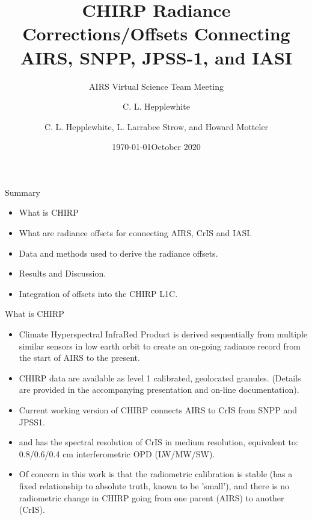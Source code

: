 \documentclass[10pt,t]{beamer}
\author{C. L. Hepplewhite}
\date{\today}
\title{\large CHIRP Radiance Corrections/Offsets Connecting AIRS, SNPP, JPSS-1, and IASI}
\subtitle{\footnotesize{AIRS Virtual Science Team Meeting}}
\date{\vspace{0.1in}\footnotesize{October 2020 \vfill}}
\author{C. L. Hepplewhite\inst{1,2}, L. Larrabee Strow\inst{1,2}, and Howard Motteler\inst{2} }
\institute[UMBC]{\inst{1} UMBC Physics Dept. \and \inst{2}UMBC JCET}
\begin{document}
\maketitle

\begin{frame}{Summary}
\begin{itemize}
  \item What is CHIRP
  \item What are radiance offsets for connecting AIRS, CrIS and IASI.
  \item Data and methods used to derive the radiance offsets.
  \item Results and Discussion.
  \item Integration of offsets into the CHIRP L1C.
    
\end{itemize}

\end{frame}
\begin{frame}{What is CHIRP}

  \begin{itemize}
  \item Climate Hyperspectral InfraRed Product is derived sequentially from
    multiple similar sensors in low earth orbit to create an on-going radiance
    record from the start of AIRS to the present.
  \item CHIRP data are available as level 1 calibrated, geolocated granules.
    (Details are provided in the accompanying presentation and on-line documentation).
  \item Current working version of CHIRP connects AIRS to CrIS from SNPP and JPSS1.
  \item and has the spectral resolution of CrIS in medium resolution, equivalent to:
    0.8/0.6/0.4 cm interferometric OPD (LW/MW/SW).
  \item Of concern in this work is that the radiometric calibration is stable (has
    a fixed relationship to absolute truth, known to be 'small'), and there is no
    radiometric change in CHIRP going from one parent (AIRS) to another (CrIS).
  \end{itemize}
  

\end{frame}
\end{document}
